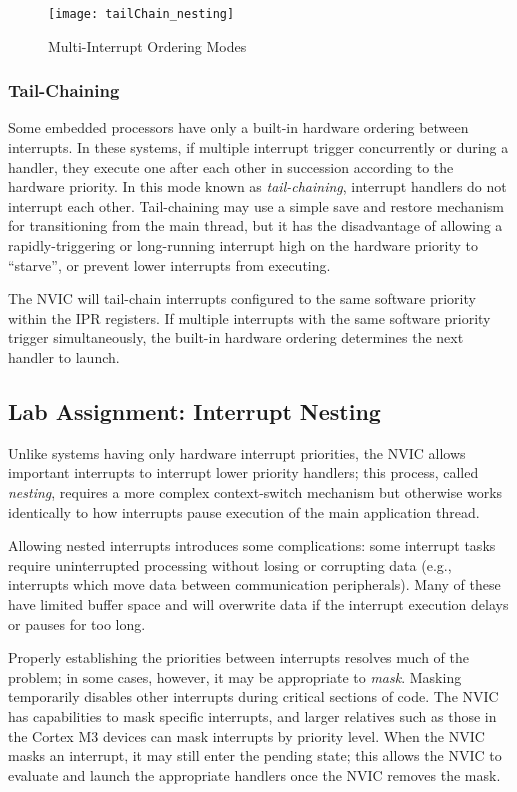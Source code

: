 \documentclass[11pt,fleqn]{book} %
\begin{document}
\begin{figure}[]
    \centering\texttt{[image: tailChain\_nesting]}
    \caption{Multi-Interrupt Ordering Modes}
    \label{tailChain_nesting}
\end{figure}

\subsubsection{Tail-Chaining}
Some embedded processors have only a built-in hardware ordering between interrupts. In these systems, if multiple interrupt trigger concurrently or during a handler, they execute one after each other in succession according to the hardware priority. In this mode known as \textit{tail-chaining}, interrupt handlers do not interrupt each other. Tail-chaining may use a simple save and restore mechanism for transitioning from the main thread, but it has the disadvantage of allowing a rapidly-triggering or long-running interrupt high on the hardware priority to ``starve'', or prevent lower interrupts from executing. 

The NVIC will tail-chain interrupts configured to the same software priority within the IPR registers. If multiple interrupts with the same software priority trigger simultaneously, the built-in hardware ordering determines the next handler to launch.

\subsection{\color{blue}Lab Assignment: Interrupt Nesting}
Unlike systems having only hardware interrupt priorities, the NVIC allows important interrupts to interrupt lower priority handlers; this process, called \textit{nesting}, requires a more complex context-switch mechanism but otherwise works identically to how interrupts pause execution of the main application thread. 

Allowing nested interrupts introduces some complications: some interrupt tasks require uninterrupted processing without losing or corrupting data (e.g., interrupts which move data between communication peripherals). Many of these have limited buffer space and will overwrite data if the interrupt execution delays or pauses for too long. 

Properly establishing the priorities between interrupts resolves much of the problem; in some cases, however, it may be appropriate to \textit{mask}. Masking temporarily disables other interrupts during critical sections of code. The NVIC has capabilities to mask specific interrupts, and larger relatives such as those in the Cortex M3 devices can mask interrupts by priority level. When the NVIC masks an interrupt, it may still enter the pending state; this allows the NVIC to evaluate and launch the appropriate handlers once the NVIC removes the mask.
\end{document}
